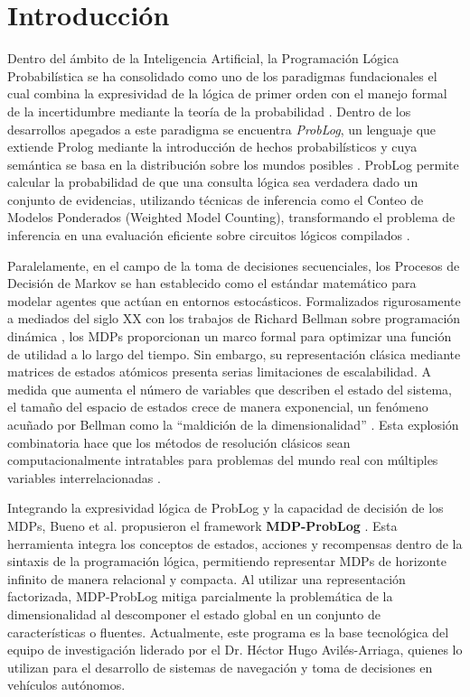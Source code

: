 \section{Introducción}
\label{ch:introduccion}

Dentro del ámbito de la Inteligencia Artificial, la Programación Lógica Probabilística se ha consolidado como uno de los paradigmas fundacionales el cual combina la expresividad de la lógica de primer orden con el manejo formal de la incertidumbre mediante la teoría de la probabilidad \cite{deraedt2007problog}. Dentro de los desarrollos apegados a este paradigma se encuentra \textit{ProbLog}, un lenguaje que extiende Prolog mediante la introducción de hechos probabilísticos y cuya semántica se basa en la distribución sobre los mundos posibles \cite{sato1995statistical}. ProbLog permite calcular la probabilidad de que una consulta lógica sea verdadera dado un conjunto de evidencias, utilizando técnicas de inferencia como el Conteo de Modelos Ponderados (Weighted Model Counting), transformando el problema de inferencia en una evaluación eficiente sobre circuitos lógicos compilados \cite{fierens2015inference}.
    
Paralelamente, en el campo de la toma de decisiones secuenciales, los Procesos de Decisión de Markov se han establecido como el estándar matemático para modelar agentes que actúan en entornos estocásticos. Formalizados rigurosamente a mediados del siglo XX con los trabajos de Richard Bellman sobre programación dinámica \cite{bellman1957dynamic}, los MDPs proporcionan un marco formal para optimizar una función de utilidad a lo largo del tiempo. Sin embargo, su representación clásica mediante matrices de estados atómicos presenta serias limitaciones de escalabilidad. A medida que aumenta el número de variables que describen el estado del sistema, el tamaño del espacio de estados crece de manera exponencial, un fenómeno acuñado por Bellman como la ``maldición de la dimensionalidad'' \cite{bellman1957dynamic}. Esta explosión combinatoria hace que los métodos de resolución clásicos sean computacionalmente intratables para problemas del mundo real con múltiples variables interrelacionadas \cite{puterman2014markov}.

Integrando la expresividad lógica de ProbLog y la capacidad de decisión de los MDPs, Bueno et al. propusieron el framework \textbf{MDP-ProbLog} \cite{bueno2016mdp}. Esta herramienta integra los conceptos de estados, acciones y recompensas dentro de la sintaxis de la programación lógica, permitiendo representar MDPs de horizonte infinito de manera relacional y compacta. Al utilizar una representación factorizada, MDP-ProbLog mitiga parcialmente la problemática de la dimensionalidad al descomponer el estado global en un conjunto de características o fluentes. Actualmente, este programa es la base tecnológica del equipo de investigación liderado por el Dr. Héctor Hugo Avilés-Arriaga, quienes lo utilizan para el desarrollo de sistemas de navegación y toma de decisiones en vehículos autónomos.


